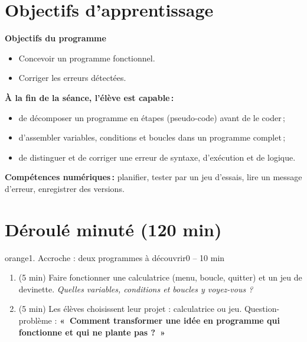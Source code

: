 \documentclass[11pt,a4paper]{article}
\begin{document}
\section{Objectifs d'apprentissage}
\begin{tcolorbox}[colback=gray!8,colframe=gray!60!black,arc=1mm,boxrule=0.5pt]
\textbf{Objectifs du programme}
\begin{itemize}
 \item Concevoir un programme fonctionnel.
 \item Corriger les erreurs détectées.
\end{itemize}
\textbf{À la fin de la séance, l'élève est capable\,:}
\begin{itemize}
 \item de décomposer un programme en étapes (pseudo-code) avant de le coder\,;
 \item d'assembler variables, conditions et boucles dans un programme complet\,;
 \item de distinguer et de corriger une erreur de syntaxe, d'exécution et de logique.
\end{itemize}
\textbf{Compétences numériques\,:} planifier, tester par un jeu d'essais, lire un message d'erreur, enregistrer des versions.
\end{tcolorbox}

\section{Déroulé minuté (120 min)}

\begin{etape}{orange}{1. Accroche : deux programmes à découvrir}{0 -- 10 min}
\begin{enumerate}
 \item (5 min) Faire fonctionner une calculatrice (menu, boucle, quitter) et un jeu de devinette. \emph{Quelles variables, conditions et boucles y voyez-vous ?}
 \item (5 min) Les élèves choisissent leur projet : calculatrice ou jeu. Question-problème : \textbf{«~Comment transformer une idée en programme qui fonctionne et qui ne plante pas ?~»}
\end{enumerate}
\end{etape}
\end{document}
